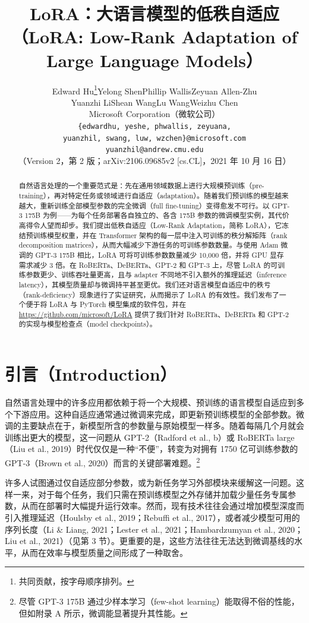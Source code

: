 \documentclass[11pt,UTF8,fontset=fandol]{ctexart}
\title{\textbf{LoRA：大语言模型的低秩自适应\\（LoRA: Low-Rank Adaptation of Large Language Models）}}
\author{Edward Hu\thanks{共同贡献，按字母顺序排列。}\quad Yelong Shen\footnotemark[1]\quad Phillip Wallis\quad Zeyuan Allen-Zhu\\
Yuanzhi Li\quad Shean Wang\quad Lu Wang\quad Weizhu Chen\\[0.4em]
Microsoft Corporation（微软公司）\\
\texttt{\{edwardhu, yeshe, phwallis, zeyuana,}\\
\texttt{yuanzhil, swang, luw, wzchen\}@microsoft.com}\\
\texttt{yuanzhil@andrew.cmu.edu}\\[0.4em]
（Version 2，第 2 版；arXiv:2106.09685v2 [cs.CL]，2021 年 10 月 16 日）}
\date{}
\begin{document}
\maketitle

\begin{abstract}
自然语言处理的一个重要范式是：先在通用领域数据上进行大规模预训练（pre-training），再对特定任务或领域进行自适应（adaptation）。随着我们预训练的模型越来越大，重新训练全部模型参数的完全微调（full fine-tuning）变得愈发不可行。以 GPT-3 175B 为例——为每个任务部署各自独立的、各含 175B 参数的微调模型实例，其代价高得令人望而却步。我们提出低秩自适应（Low-Rank Adaptation，简称 LoRA），它冻结预训练模型权重，并在 Transformer 架构的每一层中注入可训练的秩分解矩阵（rank decomposition matrices），从而大幅减少下游任务的可训练参数数量。与使用 Adam 微调的 GPT-3 175B 相比，LoRA 可将可训练参数数量减少 10{,}000 倍，并将 GPU 显存需求减少 3 倍。在 RoBERTa、DeBERTa、GPT-2 和 GPT-3 上，尽管 LoRA 的可训练参数更少、训练吞吐量更高，且与 adapter 不同地不引入额外的推理延迟（inference latency），其模型质量却与微调持平甚至更优。我们还对语言模型自适应中的秩亏（rank-deficiency）现象进行了实证研究，从而揭示了 LoRA 的有效性。我们发布了一个便于将 LoRA 与 PyTorch 模型集成的软件包，并在 \url{https://github.com/microsoft/LoRA} 提供了我们针对 RoBERTa、DeBERTa 和 GPT-2 的实现与模型检查点（model checkpoints）。
\end{abstract}

\section{引言（Introduction）}

自然语言处理中的许多应用都依赖于将一个大规模、预训练的语言模型自适应到多个下游应用。这种自适应通常通过微调来完成，即更新预训练模型的全部参数。微调的主要缺点在于，新模型所含的参数量与原始模型一样多。随着每隔几个月就会训练出更大的模型，这一问题从 GPT-2（Radford et al., b）或 RoBERTa large（Liu et al., 2019）时代仅仅是一种“不便”，转变为对拥有 1750 亿可训练参数的 GPT-3（Brown et al., 2020）而言的关键部署难题。\footnote{尽管 GPT-3 175B 通过少样本学习（few-shot learning）能取得不俗的性能，但如附录 A 所示，微调能显著提升其性能。}

许多人试图通过仅自适应部分参数，或为新任务学习外部模块来缓解这一问题。这样一来，对于每个任务，我们只需在预训练模型之外存储并加载少量任务专属参数，从而在部署时大幅提升运行效率。然而，现有技术往往会通过增加模型深度而引入推理延迟（Houlsby et al., 2019；Rebuffi et al., 2017），或者减少模型可用的序列长度（Li \& Liang, 2021；Lester et al., 2021；Hambardzumyan et al., 2020；Liu et al., 2021）（见第 3 节）。更重要的是，这些方法往往无法达到微调基线的水平，从而在效率与模型质量之间形成了一种取舍。
\end{document}
